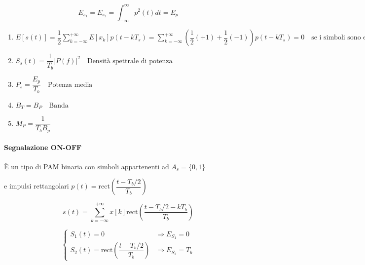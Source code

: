 \documentclass{article}
\begin{document}
\[
E_{s_1} = E_{s_2} = \int_{-\infty}^{\infty} p^2(t) dt = E_p
\]

\begin{center}
    
\end{center}



\begin{enumerate}
  \item $E\left[s(t)\right] = \dfrac{1}{2} \sum_{k=-\infty}^{+\infty} E[x_k] p(t-kT_s)
  = \sum_{k=-\infty}^{+\infty} \left(\dfrac{1}{2} (+1) + \dfrac{1}{2} (-1)\right) p(t-kT_s) = 0 \quad \text{se i simboli sono equiprobabili}$
  
  \item $S_s(t) = \dfrac{1}{T_b} |P(f)|^2 \quad \text{Densità spettrale di potenza}$
  
  \item $P_s = \dfrac{E_p}{T_b} \quad \text{Potenza media}$
  
  \item $B_T = B_P \quad \text{Banda}$
  
  \item $M_P = \dfrac{1}{T_bB_p}$
\end{enumerate}

\paragraph{Segnalazione ON-OFF}

È un tipo di PAM binaria con simboli appartenenti ad $A_s = \{0, 1\}$

e impulsi rettangolari  $p(t) = \text{rect}\left(\dfrac{t-T_b/2}{T_b}\right)$

\[ 
s(t) = \sum_{k=-\infty}^{+\infty} x\left[k\right] \text{rect}\left(\dfrac{t-T_b/2-kT_b}{T_b}\right)
\]

\[
\begin{cases}
  S_1(t) = 0 & \Rightarrow E_{S_1} = 0 \\
  S_2(t) = \text{rect}\left(\dfrac{t-T_b/2}{T_b}\right) & \Rightarrow E_{S_2} = T_b
\end{cases}
\]
\end{document}
